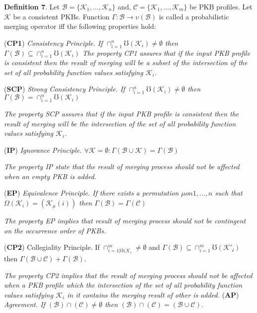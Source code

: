 \documentclass[]{iosart2c}
\begin{document}
    \textbf{Definition 7}. Let $\mathcal{B} = \{\mathcal{K}_1 , ... ,\mathcal{K}_n\}$ and, $\mathcal{C} = \{\mathcal{K}_1, ... ,\mathcal{K}_m\}$ be PKB profiles. Let $\mathcal{K}$ be a consistent PKBs. Function $\Gamma: \mathcal{B} \to \upsilon(\mathcal{B})$ is called a probabilistic merging operator iff the following properties hold:

    (\textbf{CP1}) \textit{Consistency Principle. If $\cap^n_{i=1}\mho(\mathcal{K}_i) \neq \emptyset$ then $\Gamma(\mathcal{B}) \subseteq \cap^n_{i=1}\mho(\mathcal{K}_i)$
        The property CP1 assures that if the input PKB profile is consistent then the result of merging will be a subset of the intersection of the set of all probability function values satisfying $\mathcal{K}_i$.}

    (\textbf{SCP}) \textit{Strong Consistency Principle. If $\cap^n_{i=1}\mho(\mathcal{K}_i) \neq \emptyset$ then $\Gamma(\mathcal{B}) = \cap^n_{i=1}\mho(\mathcal{K}_i)$}

    \textit{The property SCP assures that if the input PKB profile is consistent then the result of merging will be the intersection of the set of all probability function
    values satisfying $\mathcal{K}_i$.}

    (\textbf{IP}) \textit{Ignorance Principle. $\forall \mathcal{K} = \emptyset : \Gamma(\mathcal{B} \cup \mathcal{K}) = \Gamma(\mathcal{B})$}

    \textit{The property IP state that the result of merging process should not be affected when an empty PKB is added.}

    (\textbf{EP}) \textit{Equivalence Principle. If there exists a permutation $\mu on {1, ... , n}$ such that $\Omega(\mathcal{K}_i) = (\mathcal{K}_\mu(i))$ then $\Gamma(\mathcal{B}) =  \Gamma(\mathcal{C})$}

    \textit{The property EP implies that result of merging process should not be contingent on the occurrence order of PKBs.}

    (\textbf{CP2}) Collegiality Principle. If $\cap^m_{i=1|\mho(\mathcal{K}_i} \neq \emptyset$ and $\Gamma(\mathcal{B}) \subseteq \cap^m_{i=1}\mho(\mathcal{K'_i})$ then $\Gamma(\mathcal{B} \cup \mathcal{C}) + \Gamma(\mathcal{B})$.

    \textit{The property CP2 implies that the result of merging process should not be affected when a PKB profile which the intersection of the set of all probability function values satisfying $\mathcal{K}_i$ in it contains the merging result of other is added.
    }
    (\textbf{AP}) \textit{Agreement. If $(\mathcal{B}) \cap (\mathcal{C}) \neq \emptyset$ then $(\mathcal{B}) \cap (\mathcal{C}) = (\mathcal{B} \cup \mathcal{C})$.}
\end{document}
